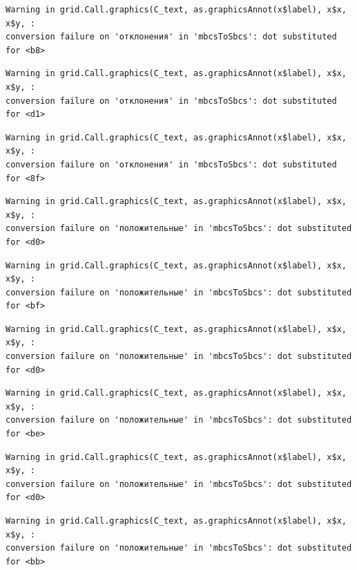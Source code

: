 \documentclass[
  letterpaper,
]{scrbook}
\theoremstyle{definition}
\theoremstyle{remark}
\begin{document}
\begin{verbatim}
Warning in grid.Call.graphics(C_text, as.graphicsAnnot(x$label), x$x, x$y, :
conversion failure on 'отклонения' in 'mbcsToSbcs': dot substituted for <b8>
\end{verbatim}

\begin{verbatim}
Warning in grid.Call.graphics(C_text, as.graphicsAnnot(x$label), x$x, x$y, :
conversion failure on 'отклонения' in 'mbcsToSbcs': dot substituted for <d1>
\end{verbatim}

\begin{verbatim}
Warning in grid.Call.graphics(C_text, as.graphicsAnnot(x$label), x$x, x$y, :
conversion failure on 'отклонения' in 'mbcsToSbcs': dot substituted for <8f>
\end{verbatim}

\begin{verbatim}
Warning in grid.Call.graphics(C_text, as.graphicsAnnot(x$label), x$x, x$y, :
conversion failure on 'положительные' in 'mbcsToSbcs': dot substituted for <d0>
\end{verbatim}

\begin{verbatim}
Warning in grid.Call.graphics(C_text, as.graphicsAnnot(x$label), x$x, x$y, :
conversion failure on 'положительные' in 'mbcsToSbcs': dot substituted for <bf>
\end{verbatim}

\begin{verbatim}
Warning in grid.Call.graphics(C_text, as.graphicsAnnot(x$label), x$x, x$y, :
conversion failure on 'положительные' in 'mbcsToSbcs': dot substituted for <d0>
\end{verbatim}

\begin{verbatim}
Warning in grid.Call.graphics(C_text, as.graphicsAnnot(x$label), x$x, x$y, :
conversion failure on 'положительные' in 'mbcsToSbcs': dot substituted for <be>
\end{verbatim}

\begin{verbatim}
Warning in grid.Call.graphics(C_text, as.graphicsAnnot(x$label), x$x, x$y, :
conversion failure on 'положительные' in 'mbcsToSbcs': dot substituted for <d0>
\end{verbatim}

\begin{verbatim}
Warning in grid.Call.graphics(C_text, as.graphicsAnnot(x$label), x$x, x$y, :
conversion failure on 'положительные' in 'mbcsToSbcs': dot substituted for <bb>
\end{verbatim}
\end{document}
